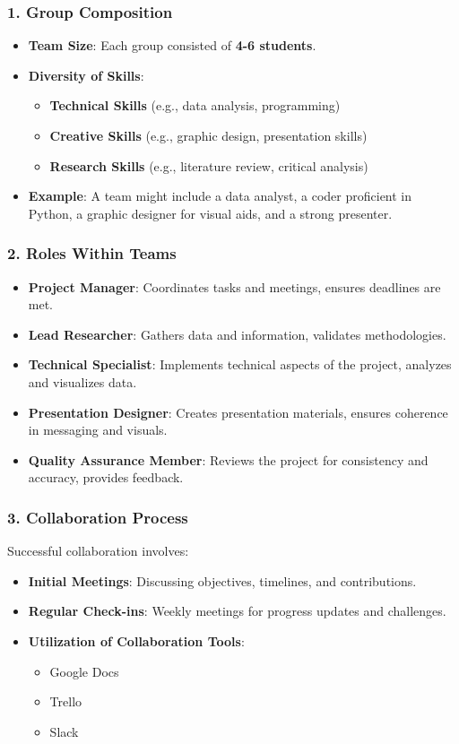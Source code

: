 \documentclass[aspectratio=169]{beamer}
\begin{document}
\begin{frame}[fragile]
    \frametitle{1. Group Composition}
    \begin{itemize}
        \item \textbf{Team Size}: Each group consisted of \textbf{4-6 students}.
        \item \textbf{Diversity of Skills}: 
            \begin{itemize}
                \item \textbf{Technical Skills} (e.g., data analysis, programming)
                \item \textbf{Creative Skills} (e.g., graphic design, presentation skills)
                \item \textbf{Research Skills} (e.g., literature review, critical analysis)
            \end{itemize}
        \item \textbf{Example}: A team might include a data analyst, a coder proficient in Python, a graphic designer for visual aids, and a strong presenter.
    \end{itemize}
\end{frame}

\begin{frame}[fragile]
    \frametitle{2. Roles Within Teams}
    \begin{itemize}
        \item \textbf{Project Manager}: Coordinates tasks and meetings, ensures deadlines are met.
        \item \textbf{Lead Researcher}: Gathers data and information, validates methodologies.
        \item \textbf{Technical Specialist}: Implements technical aspects of the project, analyzes and visualizes data.
        \item \textbf{Presentation Designer}: Creates presentation materials, ensures coherence in messaging and visuals.
        \item \textbf{Quality Assurance Member}: Reviews the project for consistency and accuracy, provides feedback.
    \end{itemize}
\end{frame}

\begin{frame}[fragile]
    \frametitle{3. Collaboration Process}
    Successful collaboration involves:
    \begin{itemize}
        \item \textbf{Initial Meetings}: Discussing objectives, timelines, and contributions.
        \item \textbf{Regular Check-ins}: Weekly meetings for progress updates and challenges.
        \item \textbf{Utilization of Collaboration Tools}: 
            \begin{itemize}
                \item Google Docs
                \item Trello
                \item Slack
            \end{itemize}
    \end{itemize}
\end{frame}
\end{document}
